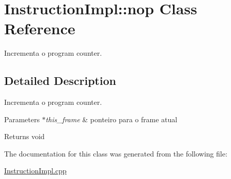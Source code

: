 \hypertarget{class_instruction_impl_1_1nop}{}\section{Instruction\+Impl\+:\+:nop Class Reference}
\label{class_instruction_impl_1_1nop}


Incrementa o program counter.  




\subsection{Detailed Description}
Incrementa o program counter. 


\begin{DoxyParams}{Parameters}
{\em $\ast$this\+\_\+frame} & ponteiro para o frame atual \\
\hline
\end{DoxyParams}
\begin{DoxyReturn}{Returns}
void 
\end{DoxyReturn}


The documentation for this class was generated from the following file\+:\begin{DoxyCompactItemize}
\item 
\hyperlink{_instruction_impl_8cpp}{Instruction\+Impl.\+cpp}\end{DoxyCompactItemize}
